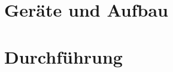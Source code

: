 \section{Geräte und Aufbau}
\label{sec:aufbau}





\section{Durchführung}
\label{sec:durch}










